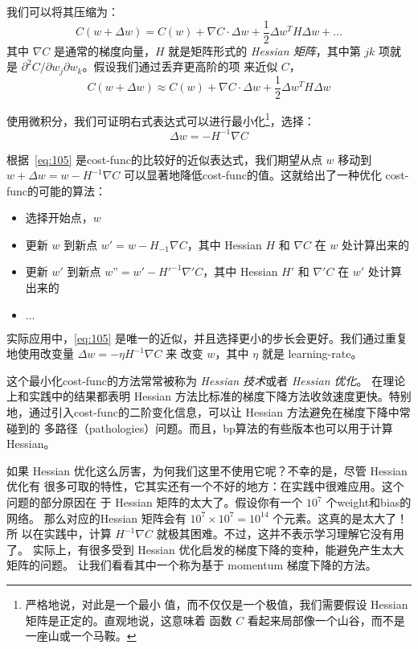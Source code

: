 我们可以将其压缩为：
\begin{equation}
  C(w+\Delta w) = C(w) + \nabla C \cdot \Delta w +
  \frac{1}{2} \Delta w^T H \Delta w + \ldots
  \label{eq:104}\tag{104}
\end{equation}
其中 $\nabla C$ 是通常的梯度向量，$H$ 就是矩阵形式的 \emph{Hessian 矩阵}，其中第
$jk$ 项就是 $\partial^2 C/\partial w_j\partial w_k$。假设我们通过丢弃更高阶的项
来近似 $C$，
\begin{equation} 
  C(w+\Delta w) \approx C(w) + \nabla C \cdot \Delta w +
  \frac{1}{2} \Delta w^T H \Delta w
  \label{eq:105}\tag{105}
\end{equation}

使用微积分，我们可证明右式表达式可以进行最小化\footnote{严格地说，对此是一个最小
  值，而不仅仅是一个极值，我们需要假设 Hessian 矩阵是正定的。直观地说，这意味着
  函数 $C$ 看起来局部像一个山谷，而不是一座山或一个马鞍。}，选择：
\begin{equation}
  \Delta w = -H^{-1} \nabla C
  \label{eq:106}\tag{106}
\end{equation}

根据~\eqref{eq:105} 是\gls*{cost-func}的比较好的近似表达式，我们期望从点 $w$ 移动到
$w+\Delta w = w - H^{-1}\nabla C$ 可以显著地降低\gls*{cost-func}的值。这就给出了一种优化
\gls*{cost-func}的可能的算法：
\begin{itemize}
\item 选择开始点，$w$
\item 更新 $w$ 到新点 $w' = w - H_{-1}\nabla C$，其中 Hessian $H$ 和 $\nabla C$
  在 $w$ 处计算出来的
\item 更新 $w'$ 到新点 $w” = w' - H'^{-1}\nabla' C$，其中 Hessian $H'$ 和
  $\nabla' C$ 在 $w'$ 处计算出来的
\item $\ldots$
\end{itemize}

实际应用中，\eqref{eq:105} 是唯一的近似，并且选择更小的步长会更好。我们通过重复
地使用改变量 $\Delta w = -\eta H^{-1} \nabla C$ 来 改变 $w$，其中 $\eta$ 就是
\gls*{learning-rate}。

这个最小化\gls*{cost-func}的方法常常被称为 \emph{Hessian 技术}或者 \emph{Hessian 优化}。
在理论上和实践中的结果都表明 Hessian 方法比标准的梯度下降方法收敛速度更快。特别
地，通过引入\gls*{cost-func}的二阶变化信息，可以让 Hessian 方法避免在梯度下降中常碰到的
多路径（pathologies）问题。而且，\gls*{bp}算法的有些版本也可以用于计算 Hessian。

如果 Hessian 优化这么厉害，为何我们这里不使用它呢？不幸的是，尽管 Hessian 优化有
很多可取的特性，它其实还有一个不好的地方：在实践中很难应用。这个问题的部分原因在
于 Hessian 矩阵的太大了。假设你有一个 $10^7$ 个\gls*{weight}和\gls*{bias}的网络。
那么对应的Hessian 矩阵会有 $10^7 \times 10^7=10^{14}$ 个元素。这真的是太大了！所
以在实践中，计算 $H^{-1}\nabla C$ 就极其困难。不过，这并不表示学习理解它没有用了。
实际上，有很多受到 Hessian 优化启发的梯度下降的变种，能避免产生太大矩阵的问题。
让我们看看其中一个称为基于 momentum 梯度下降的方法。\\

